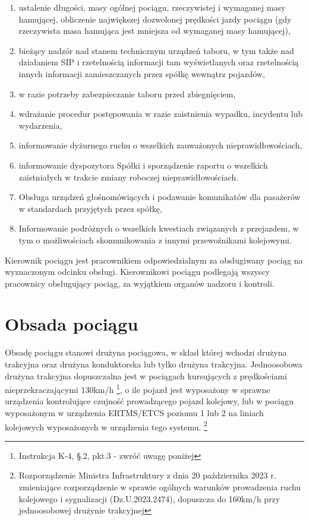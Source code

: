 \begin{enumerate}
	\item ustalenie długości, masy ogólnej pociągu, rzeczywistej i wymaganej masy hamującej, obliczenie największej dozwolonej prędkości jazdy pociągu (gdy rzeczywista masa hamująca jest mniejsza od wymaganej masy hamującej),
	\item bieżący nadzór nad stanem technicznym urządzeń taboru, w tym także nad działaniem SIP i rzetelnością informacji tam wyświetlanych oraz rzetelnością innych informacji zamieszczanych przez spółkę wewnątrz pojazdów,
	\item w razie potrzeby zabezpieczanie taboru przed zbiegnięciem,
	\item wdrażanie procedur postępowania w razie zaistnienia wypadku, incydentu lub wydarzenia,
	\item informowanie dyżurnego ruchu o wszelkich zauważonych nieprawidłowościach,
	\item informowanie dyspozytora Spółki i sporządzenie raportu o wszelkich zaistniałych w trakcie zmiany roboczej nieprawidłowościach.
	\item Obsługa urządzeń głośnomówiących i podawanie komunikatów dla pasażerów w standardach przyjętych przez spółkę,
	\item Informowanie podróżnych o wszelkich kwestiach związanych z przejazdem, w tym o możliwościach skomunikowania z innymi przewoźnikami kolejowymi.
\end{enumerate}
Kierownik pociągu jest pracownikiem odpowiedzialnym za obsługiwany pociąg na wyznaczonym odcinku obsługi. Kierownikowi pociągu podlegają wszyscy
pracownicy obsługujący pociąg, za wyjątkiem organów nadzoru i kontroli.

\section{Obsada pociągu}
\label{sec:obsada}
Obsadę pociągu stanowi drużyna pociągowa, w skład której wchodzi drużyna trakcyjna oraz drużyna konduktorska lub tylko drużyna trakcyjna. Jednoosobowa drużyna trakcyjna dopuszczalna jest w pociągach kursujących z prędkościami nieprzekraczającymi 130km/h \footnote{Instrukcja K-4, \S.2, pkt.3 - zwróć uwagę poniżej}, o ile pojazd jest wyposażony w sprawne urządzenia kontrolujące czujność prowadzącego pojazd kolejowy, lub w pociągu wyposażonym w urządzenia ERTMS/ETCS poziomu 1 lub 2 na liniach kolejowych wyposażonych w urządzenia tego systemu. \footnote{Rozporządzenie Ministra Infrastruktury z dnia 20 października 2023 r. zmieniające rozporządzenie w sprawie ogólnych warunków prowadzenia ruchu kolejowego i sygnalizacji (Dz.U.2023.2474), dopuszcza do 160km/h przy jednoosobowej drużynie trakcyjnej}


